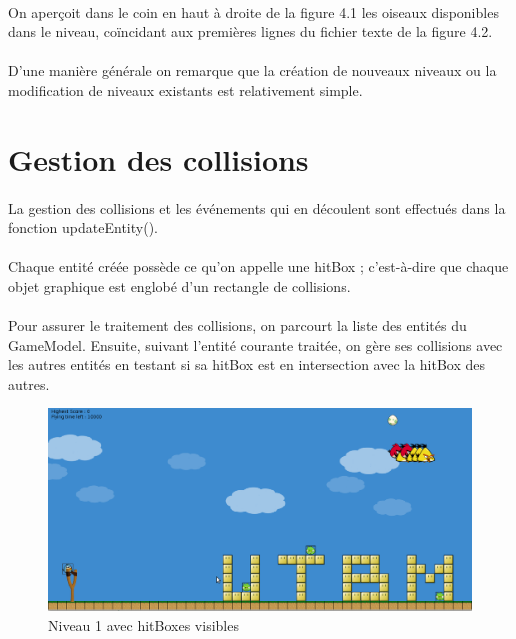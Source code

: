 \documentclass[a4paper,12pt]{report}
\begin{document}
\paragraph{}On aperçoit dans le coin en haut à droite de la figure 4.1 les oiseaux disponibles dans le niveau, coïncidant aux premières lignes du fichier texte de la figure 4.2.

\paragraph{}D'une manière générale on remarque que la création de nouveaux niveaux ou la modification de niveaux existants est relativement simple.

\section{Gestion des collisions}

\paragraph{}La gestion des collisions et les événements qui en découlent sont effectués dans la fonction updateEntity().

\paragraph{}Chaque entité créée possède ce qu'on appelle une hitBox ; c'est-à-dire que chaque objet graphique est englobé d'un rectangle de collisions. 

\paragraph{}Pour assurer le traitement des collisions, on parcourt la liste des entités du GameModel. Ensuite, suivant l'entité courante traitée, on gère ses collisions avec les autres entités en testant si sa hitBox est en intersection avec la hitBox des autres.

\begin{figure}[H]
\begin{center}
\includegraphics[scale=0.35]{images/lvl01hitbox.png} 
\end{center}
\caption{Niveau 1 avec hitBoxes visibles}
\label{Niveau 1 avec hitBoxes visibles}
\end{figure}
\end{document}
